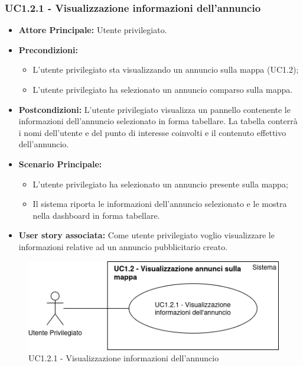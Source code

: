 \documentclass[11pt]{article}
\begin{document}
\begin{justify}
\subsubsection{\textbf{UC1.2.1 - Visualizzazione informazioni dell'annuncio}}
\label{UC1.2.1}
\begin{itemize}
    \item \textbf{Attore Principale:} Utente privilegiato.
    \item \textbf{Precondizioni:} 
        \begin{itemize}
          \item L'utente privilegiato sta visualizzando un annuncio sulla mappa (UC1.2);
    	\item L'utente privilegiato ha selezionato un annuncio comparso sulla mappa.
        \end{itemize}
    \item \textbf{Postcondizioni:} L'utente privilegiato visualizza un pannello contenente le informazioni dell'annuncio selezionato in forma tabellare. La tabella conterrà i nomi dell'utente e del punto di interesse coinvolti e il contenuto effettivo dell'annuncio.
    \item \textbf{Scenario Principale:} 
        \begin{itemize}
          \item L'utente privilegiato ha selezionato un annuncio presente sulla mappa;
            \item Il sistema riporta le informazioni dell'annuncio selezionato e le mostra nella dashboard in forma tabellare.
	\end{itemize}
    \item \textbf{User story associata:} Come utente privilegiato voglio visualizzare le informazioni relative ad un annuncio pubblicitario creato.
\end{itemize}
\begin{figure}[H]
    \centering
    \includegraphics[width=0.5\linewidth]{UC1.2.1image.png}
    \caption{UC1.2.1 - Visualizzazione informazioni dell'annuncio}
    \label{fig:UC1.2.1}
\end{figure}

\end{justify}
\end{document}
